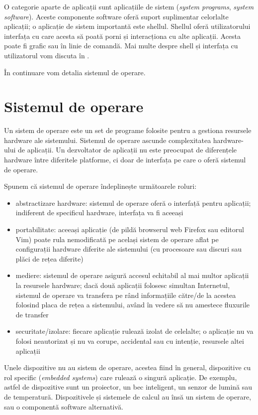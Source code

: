 O categorie aparte de aplicații sunt aplicațiile de sistem (\textit{system programs}, \textit{system software}). Aceste componente software oferă suport suplimentar celorlalte aplicații; o aplicație de sistem importantă este shellul. Shellul oferă utilizatorului interfața cu care acesta să poată porni și interacționa cu alte aplicații. Acesta poate fi grafic sau în linie de comandă. Mai multe despre shell și interfața cu utilizatorul vom discuta în .

În continuare vom detalia sistemul de operare.

\section{Sistemul de operare}
\label{sec:intro:os}

Un sistem de operare este un set de programe folosite pentru a gestiona resursele hardware ale sistemului. Sistemul de operare ascunde complexitatea hardware-ului de aplicații. Un dezvoltator de aplicații nu este preocupat de diferențele hardware între diferitele platforme, ci doar de interfața pe care o oferă sistemul de operare.

Spunem că sistemul de operare îndeplinește următoarele roluri:

\begin{itemize}
  \item abstractizare hardware: sistemul de operare oferă o interfață pentru aplicații; indiferent de specificul hardware, interfața va fi aceeași
  \item portabilitate: aceeași aplicație (de pildă browserul web Firefox sau editorul Vim) poate rula nemodificată pe același sistem de operare aflat pe configurații hardware diferite ale sistemului (cu procesoare sau discuri sau plăci de rețea diferite)
  \item mediere: sistemul de operare asigură accesul echitabil al mai multor aplicații la resursele hardware; dacă două aplicații folosesc simultan Internetul, sistemul de operare va transfera pe rând informațiile către/de la acestea folosind placa de rețea a sistemului, având în vedere să nu amestece fluxurile de transfer
  \item securitate/izolare: fiecare aplicație rulează izolat de celelalte; o aplicație nu va folosi neautorizat și nu va corupe, accidental sau cu intenție, resursele altei aplicații
\end{itemize}

Unele dispozitive nu au sistem de operare, acestea fiind în general, dispozitive cu rol specific (\textit{embedded systems}) care rulează o singură aplicație. De exemplu, astfel de dispozitive sunt un proiector, un bec inteligent, un senzor de lumină sau de temperatură. Dispozitivele și sistemele de calcul au însă un sistem de operare, sau o componentă software alternativă.

